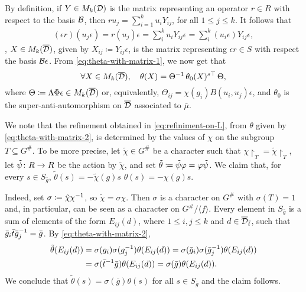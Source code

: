 By definition, if $Y \in M_k(\mathcal{D})$ is the matrix representing an operator
$r\in R$ with respect to the basis $\mathcal B$, then $ru_j = \sum_{i = 1}^k u_i Y_{ij}$, for all $1 \leq j \leq k$. 
It follows that 
\begin{align}
    (\epsilon r)(u_j\epsilon) = r(u_j) \epsilon = \sum_i^k u_i Y_{ij} \epsilon = \sum_i^k (u_i\epsilon) Y_{ij} \epsilon, 
\end{align}
\ie, $X \in \M_k (\barr \D)$, given by $X_{ij} \coloneqq Y_{ij} \epsilon$, is the matrix representing $\epsilon r \in S$ with respect the basis $\mathcal B\epsilon$. 
From \cref{eq:theta-with-matrix-1}, we now get that
\[\label{eq:theta-with-matrix-2}
    \forall X\in M_k(\barr \D), \quad \theta(X) = \Theta\inv\, \theta_0(X)\stransp\, \Theta,
\]
where $\Theta \coloneqq \Lambda \Phi \epsilon \in M_k(\barr \D)$ or, equivalently, $\Theta_{ij} = \chi(g_i) B(u_i, u_j) \epsilon$, and $\theta_0$ is the super-anti-automorphism on $\barr \D$ associated to $\bar \mu$. 

We note that the refinement obtained in \cref{eq:refiniment-on-L}, from $\theta$ given by \cref{eq:theta-with-matrix-2}, is determined by the values of $\chi$ on the subgroup $T \subseteq G^\#$. 
To be more precise, let $\tilde \chi \in \widehat {G^\#}$ be a character such that $\chi\restriction_{T} = \tilde\chi\restriction_{T}$, let $\tilde \psi \colon R\to R$ be the action by $\tilde \chi$, and set $\tilde \theta \coloneqq \tilde\psi \varphi = \varphi \tilde\psi$. 
We claim that, for every $s \in S_{\bar g}$, $\tilde\theta(s) = - \tilde\chi(g) s$ \IFF $\theta(s) = - \chi(g) s$. 

Indeed, set $\sigma \coloneqq \tilde\chi\chi^{-1}$, so $\tilde\chi = \sigma \chi$. 
Then $\sigma$ is a character on $G^\#$ with $\sigma(T) = 1$ and, in particular, can be seen as a character on $G^\#/\langle f \rangle$. 
Every element in $S_{\bar g}$ is a sum of elements of the form $E_{ij}(d)$, where $1 \leq i, j \leq k$ and $d\in \barr \D_{\bar t}$, such that $\bar g_i \bar t \bar g_j^{-1} = \bar g$. 
By \cref{eq:theta-with-matrix-2}, 
\begin{align}
    \tilde\theta(E_{ij}(d)) 
    &= \sigma(g_i) \sigma(g_j^{-1}) \theta (E_{ij}(d)) 
    = \sigma(\bar g_i) \sigma(\bar g_j^{-1}) \theta (E_{ij}(d)) \\ 
    &= \sigma(\bar t^{-1} \bar g) \theta(E_{ij}(d)) 
    = \sigma(\bar g) \theta(E_{ij}(d)).
\end{align} 
We conclude that $\tilde\theta(s) = \sigma(\bar g) \theta(s)$ for all $s\in S_{\bar g}$ and the claim follows. 

